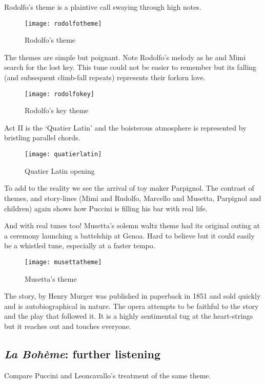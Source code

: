 Rodolfo's theme is a plaintive call swaying through high notes.

\begin{figure}[H]
\centering
\texttt{[image: rodolfotheme]}\caption{Rodolfo's theme}
\label{fig:rodolfotheme}
\end{figure}
 
The themes are simple but poignant. Note Rodolfo's melody as he and Mimi search for the lost key. This tune could not be easier to remember but its falling (and subsequent climb-fall repeats) represents their forlorn love. 

\begin{figure}[H]
\centering
\texttt{[image: rodolfokey]}\caption{Rodolfo's key theme}
\label{fig:rodolfokey}
\end{figure}

Act II is the `Quatier Latin' and the boisterous atmosphere is represented by bristling parallel chords. 

\begin{figure}[H]
\centering
\texttt{[image: quatierlatin]}\caption{Quatier Latin opening}
\label{fig:quatierlatin}
\end{figure}

To add to the reality we see the arrival of toy maker Parpignol. The contrast of themes, and story-lines (Mimi and Rudolfo, Marcello and Musetta, Parpignol and children) again shows how Puccini is filling his bar with real life.

And with real tunes too! Musetta's solemn waltz theme had its original outing at a ceremony launching a battelship at Genoa. Hard to believe but it could easily be a whistled tune, especially at a faster tempo. 

\begin{figure}[H]
\centering
\texttt{[image: musettatheme]}\caption{Musetta's theme}
\label{fig:musettatheme}
\end{figure}

The story, by Henry Murger was published in paperback in 1851 and sold quickly and is autobiographical in nature. The opera attempts to be faithful to the story and the play that followed it. It is a highly sentimental tug at the heart-strings but it reaches out and touches everyone. 

\subsection{\textit{La Boh\`eme}: further listening}
Compare Puccini and Leoncavallo's treatment of the same theme. 

